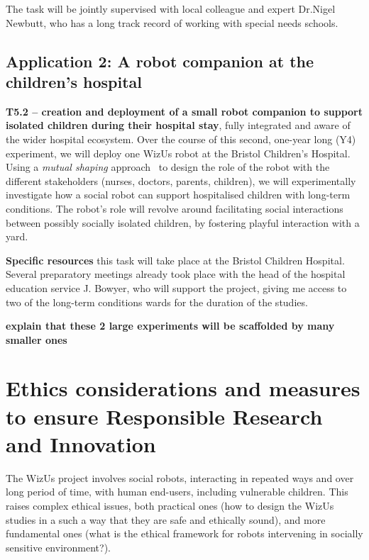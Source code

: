 \documentclass[11pt,a4paper]{report}
\newcommand{\project}{WizUs\xspace}
\newcommand{\TODO}[1]{{\color{red}\textbf{#1}}}
\begin{document}
The task will be jointly supervised with local colleague and expert Dr.Nigel Newbutt,
who has a long track record of working with special needs schools.





\subsection{Application 2: A robot companion at the children's hospital}
\textbf{T5.2 -- creation and deployment of a small robot companion to support
isolated children during their hospital stay}, fully integrated and aware of the
wider hospital ecosystem. Over the course of this second, one-year long (Y4)
experiment, we will deploy one \project robot at the Bristol Children's Hospital.
Using a \emph{mutual shaping} approach~\cite{winkle2018social} to design the
role of the robot with the different stakeholders (nurses, doctors, parents,
children), we will experimentally investigate how a social robot can support
hospitalised children with long-term conditions. The robot's role will revolve
around facilitating social interactions between possibly socially isolated
children, by fostering playful interaction with a yard.

\textbf{Specific resources} this task will take place at the Bristol Children
Hospital. Several preparatory meetings already took place with the head of the
hospital education service J. Bowyer, who will support the project, giving me
access to two of the long-term conditions wards for the duration of the studies.



\TODO{explain that these 2 large experiments will be scaffolded by many smaller
ones}


\section{Ethics considerations and measures to ensure Responsible Research and Innovation}

The \project project involves social robots, interacting in repeated ways and
over long period of time, with human end-users, including vulnerable children.
This raises complex ethical issues, both practical ones (how to design the
\project studies in a such a way that they are safe and ethically sound), and
more fundamental ones (what is the ethical framework for robots intervening in
socially sensitive environment?).
\end{document}
